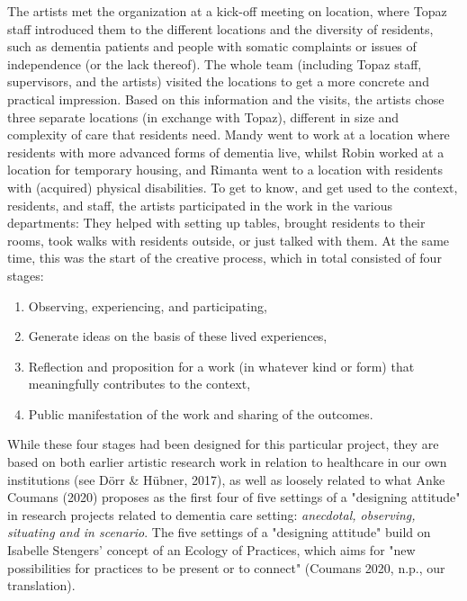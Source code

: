 \documentclass[authordate, empirical]{jote-new-article}
\begin{document}
	The artists met the organization at a kick-off meeting on location, where Topaz staff introduced them to the different locations and the diversity of residents, such as dementia patients and people with somatic complaints or issues of independence (or the lack thereof). The whole team (including Topaz staff, supervisors, and the artists) visited the locations to get a more concrete and practical impression. Based on this information and the visits, the artists chose three separate locations (in exchange with Topaz), different in size and complexity of care that residents need. Mandy went to work at a location where residents with more advanced forms of dementia live, whilst Robin worked at a location for temporary housing, and Rimanta went to a location with residents with (acquired) physical disabilities. To get to know, and get used to the context, residents, and staff, the artists participated in the work in the various departments: They helped with setting up tables, brought residents to their rooms, took walks with residents outside, or just talked with them. At the same time, this was the start of the creative process, which in total consisted of four stages:





	\begin{enumerate}


		\item Observing, experiencing, and participating,



		\item Generate ideas on the basis of these lived experiences,



		\item Reflection and proposition for a work (in whatever kind or form) that meaningfully contributes to the context,



		\item Public manifestation of the work and sharing of the outcomes.


	\end{enumerate}





	While these four stages had been designed for this particular project, they are based on both earlier artistic research work in relation to healthcare in our own institutions (see Dörr \& Hübner, 2017), as well as loosely related to what Anke Coumans (2020) proposes as the first four of five settings of a "designing attitude" in research projects related to dementia care setting: \emph{anecdotal, observing, situating and in scenario}. The five settings of a "designing attitude" build on Isabelle Stengers' concept of an Ecology of Practices, which aims for "new possibilities for practices to be present or to connect" (Coumans 2020, n.p., our translation).
\end{document}
